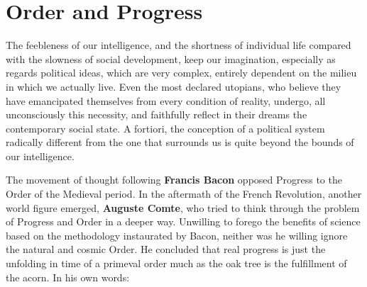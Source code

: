 \section{Order and Progress}

\begin{quotex}
The feebleness of our intelligence, and the shortness of individual life compared with the slowness of social development, keep our imagination, especially as regards political ideas, which are very complex, entirely dependent on the milieu in which we actually live. Even the most declared utopians, who believe they have emancipated themselves from every condition of reality, undergo, all unconsciously this necessity, and faithfully reflect in their dreams the contemporary social state. A fortiori, the conception of a political system radically different from the one that surrounds us is quite beyond the bounds of our intelligence.
\end{quotex}

The movement of thought following \textbf{Francis Bacon} opposed Progress to the Order of the Medieval period. In the aftermath of the French Revolution, another world figure emerged, \textbf{Auguste Comte}, who tried to think through the problem of Progress and Order in a deeper way. Unwilling to forego the benefits of science based on the methodology instaurated by Bacon, neither was he willing ignore the natural and cosmic Order. He concluded that real progress is just the unfolding in time of a primeval order much as the oak tree is the fulfillment of the acorn. In his own words:

